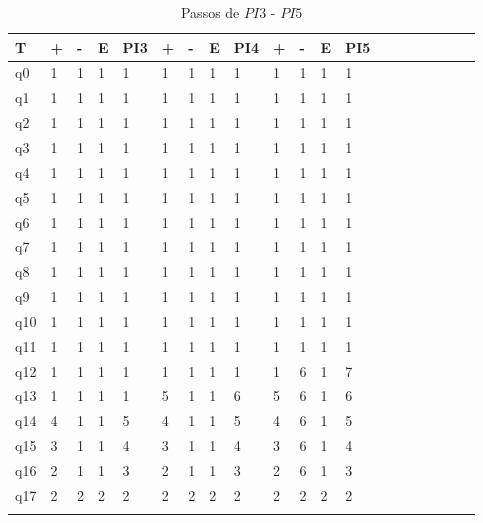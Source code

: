 \documentclass[12pt,a4paper]{report}
\begin{document}
\begin{table}[ht]
\caption{\label{tab:table-name} Passos de $PI3$ - $PI5$}
\centering
\begin{tabular}{ l l l l l l l l l l l l l l l l l l l l }
\hline
\hline
T      & + & - & E & PI3 & + & - & E & PI4 & + & - & E & PI5 &  &  &  &  &  &  &  \\ \hline
q0  & 1 & 1 & 1 & 1   & 1 & 1 & 1 & 1   & 1 & 1 & 1 & 1   &  &  &  &  &  &  &  \\
q1  & 1 & 1 & 1 & 1   & 1 & 1 & 1 & 1   & 1 & 1 & 1 & 1   &  &  &  &  &  &  &  \\
q2  & 1 & 1 & 1 & 1   & 1 & 1 & 1 & 1   & 1 & 1 & 1 & 1   &  &  &  &  &  &  &  \\
q3  & 1 & 1 & 1 & 1   & 1 & 1 & 1 & 1   & 1 & 1 & 1 & 1   &  &  &  &  &  &  &  \\
q4  & 1 & 1 & 1 & 1   & 1 & 1 & 1 & 1   & 1 & 1 & 1 & 1   &  &  &  &  &  &  &  \\
q5  & 1 & 1 & 1 & 1   & 1 & 1 & 1 & 1   & 1 & 1 & 1 & 1   &  &  &  &  &  &  &  \\
q6  & 1 & 1 & 1 & 1   & 1 & 1 & 1 & 1   & 1 & 1 & 1 & 1   &  &  &  &  &  &  &  \\
q7  & 1 & 1 & 1 & 1   & 1 & 1 & 1 & 1   & 1 & 1 & 1 & 1   &  &  &  &  &  &  &  \\
q8  & 1 & 1 & 1 & 1   & 1 & 1 & 1 & 1   & 1 & 1 & 1 & 1   &  &  &  &  &  &  &  \\
q9  & 1 & 1 & 1 & 1   & 1 & 1 & 1 & 1   & 1 & 1 & 1 & 1   &  &  &  &  &  &  &  \\
q10 & 1 & 1 & 1 & 1   & 1 & 1 & 1 & 1   & 1 & 1 & 1 & 1   &  &  &  &  &  &  &  \\
q11 & 1 & 1 & 1 & 1   & 1 & 1 & 1 & 1   & 1 & 1 & 1 & 1   &  &  &  &  &  &  &  \\
q12 & 1 & 1 & 1 & 1   & 1 & 1 & 1 & 1   & 1 & 6 & 1 & 7   &  &  &  &  &  &  &  \\
q13 & 1 & 1 & 1 & 1   & 5 & 1 & 1 & 6   & 5 & 6 & 1 & 6   &  &  &  &  &  &  &  \\
q14 & 4 & 1 & 1 & 5   & 4 & 1 & 1 & 5   & 4 & 6 & 1 & 5   &  &  &  &  &  &  &  \\
q15 & 3 & 1 & 1 & 4   & 3 & 1 & 1 & 4   & 3 & 6 & 1 & 4   &  &  &  &  &  &  &  \\
q16 & 2 & 1 & 1 & 3   & 2 & 1 & 1 & 3   & 2 & 6 & 1 & 3   &  &  &  &  &  &  &  \\
q17 & 2 & 2 & 2 & 2   & 2 & 2 & 2 & 2   & 2 & 2 & 2 & 2   &  &  &  &  &  &  &  \\
       &   &   &   &     &   &   &   &     &   &   &   &     &  &  &  &  &  &  &  \\
       \hline
\end{tabular}
\end{table}
\end{document}
